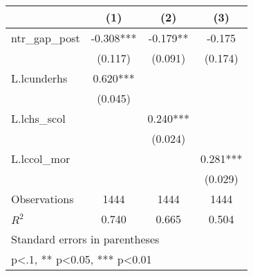 {
\def\sym#1{\ifmmode^{#1}\else\(^{#1}\)\fi}
\begin{tabular}{l*{3}{c}}
\toprule
                    &\multicolumn{1}{c}{(1)}   &\multicolumn{1}{c}{(2)}   &\multicolumn{1}{c}{(3)}   \\
\midrule
ntr\_gap\_post        &   -0.308***&   -0.179** &   -0.175   \\
                    &  (0.117)   &  (0.091)   &  (0.174)   \\
\addlinespace
L.lcunderhs         &    0.620***&            &            \\
                    &  (0.045)   &            &            \\
\addlinespace
L.lchs\_scol         &            &    0.240***&            \\
                    &            &  (0.024)   &            \\
\addlinespace
L.lccol\_mor         &            &            &    0.281***\\
                    &            &            &  (0.029)   \\
\midrule
Observations        &     1444   &     1444   &     1444   \\
\(R^{2}\)           &    0.740   &    0.665   &    0.504   \\
\bottomrule
\multicolumn{4}{l}{\footnotesize Standard errors in parentheses}\\
\multicolumn{4}{l}{\footnotesize * p<.1, ** p<0.05, *** p<0.01}\\
\end{tabular}
}
